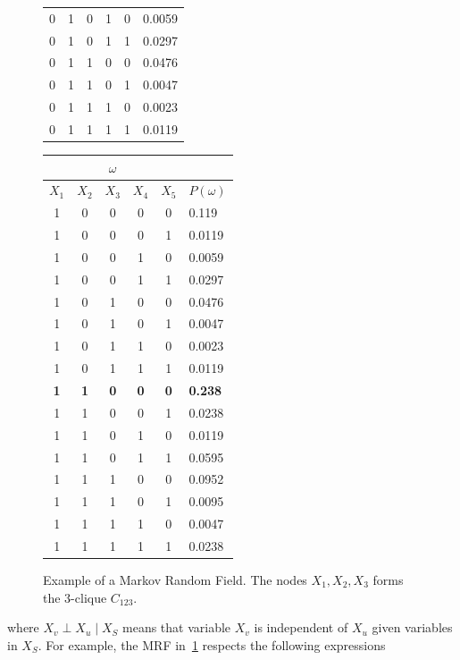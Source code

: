 \begin{figure}
\begin{minipage}{0.35\textwidth}
\begin{tabular}{|c|c|c|c|c|l|}
0 & 1 & 0 & 1 & 0 & 0.0059 \\
0 & 1 & 0 & 1 & 1 & 0.0297 \\
0 & 1 & 1 & 0 & 0 & 0.0476 \\
0 & 1 & 1 & 0 & 1 & 0.0047 \\
0 & 1 & 1 & 1 & 0 & 0.0023 \\
0 & 1 & 1 & 1 & 1 & 0.0119 \\
\hline
\end{tabular}
\end{minipage}%
\begin{minipage}{0.35\textwidth}
\tiny
\begin{tabular}{|c|c|c|c|c|l|}
\hline
\multicolumn{5}{|c|}{$\omega$} &\\
\hline
$X_1$ & $X_2$ & $X_3$ & $X_4$ & $X_5$ & $P(\omega)$\\
\hline
1 & 0 & 0 & 0 & 0 & 0.119 \\
1 & 0 & 0 & 0 & 1 & 0.0119 \\
1 & 0 & 0 & 1 & 0 & 0.0059 \\
1 & 0 & 0 & 1 & 1 & 0.0297 \\
1 & 0 & 1 & 0 & 0 & 0.0476 \\
1 & 0 & 1 & 0 & 1 & 0.0047 \\
1 & 0 & 1 & 1 & 0 & 0.0023 \\
1 & 0 & 1 & 1 & 1 & 0.0119 \\
\textbf{1} & \textbf{1} & \textbf{0} & \textbf{0} & \textbf{0} & \textbf{0.238} \\
1 & 1 & 0 & 0 & 1 & 0.0238 \\
1 & 1 & 0 & 1 & 0 & 0.0119 \\
1 & 1 & 0 & 1 & 1 & 0.0595 \\
1 & 1 & 1 & 0 & 0 & 0.0952 \\
1 & 1 & 1 & 0 & 1 & 0.0095 \\
1 & 1 & 1 & 1 & 0 & 0.0047 \\
1 & 1 & 1 & 1 & 1 & 0.0238 \\
\hline
\end{tabular}
\end{minipage}
\caption{Example of a Markov Random Field. The nodes $X_1, X_2, X_3$ forms the $3$-clique $C_{123}$.}
\label{ch2:fig:example-mrf}
\end{figure}

where $X_v  \perp  X_u \;|\; X_S$ means that variable $X_v$ is independent of $X_u$ given variables in $X_S$.  For example, the MRF in~\cref{ch2:fig:example-mrf} respects the following expressions 

